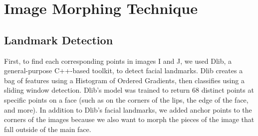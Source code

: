\documentclass[journal]{IEEEtran}
\begin{document}
%




\section{Image Morphing Technique}
\subsection{Landmark Detection}
	First, to find each corresponding points in images I and J, we used Dlib, a general-purpose C++-based toolkit, to detect facial landmarks. Dlib creates a bag of features using a Histogram of Ordered Gradients, then classifies using a sliding window detection. Dlib’s model was trained to return 68 distinct points at specific points on a face (such as on the corners of the lips, the edge of the face, and more). In addition to Dlib’s facial landmarks, we added anchor points to the corners of the images because we also want to morph the pieces of the image that fall outside of the main face.
\end{document}
